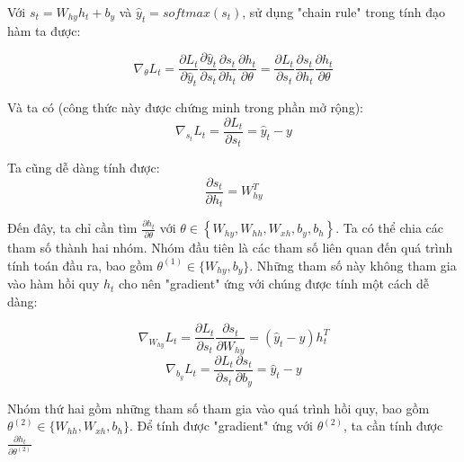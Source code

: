 Với $s_t = W_{hy} h_t + b_y$ và $\hat{y}_t = softmax(s_t)$, sử dụng "chain rule" trong tính đạo hàm ta được:
	
\begin{equation} \label{gradientCalculating1}
	\nabla_{\theta} L_t = \frac{\partial L_t}{\partial \hat{y}_t} \frac{\partial \hat{y}_t}{\partial s_t} \frac{\partial s_t}{\partial h_t} \frac{\partial h_t}{\partial \theta}  = \frac{\partial L_t}{\partial s_t} \frac{\partial s_t}{\partial h_t} \frac{\partial h_t}{\partial \theta}
\end{equation}

Và ta có (công thức này được chứng minh trong phần mở rộng):
\begin{equation} \label{gradientCalculating2}
	\nabla_{s_t}L_t = \frac{\partial L_t}{\partial s_t} = \hat{y}_t - y
\end{equation}

Ta cũng dễ dàng tính được:
\begin{equation} \label{gradientCalculating3}
	\frac{\partial s_t}{\partial h_t} = W_{hy}^T
\end{equation}

Đến đây, ta chỉ cần tìm $\frac{\partial h_t}{\partial \theta}$ với $\theta \in \left\{W_{hy},W_{hh},W_{xh},b_y,b_h \right \}$. Ta có thể chia các tham số thành hai nhóm. Nhóm đầu tiên là các tham số liên quan đến quá trình tính toán đầu ra, bao gồm $\theta^{(1)} \in \{W_{hy}, b_y\}$. Những tham số này không tham gia vào hàm hồi quy $h_t$ cho nên "gradient" ứng với chúng được tính một cách dễ dàng:

\begin{equation} \label{gradientCalculating4}
	\nabla_{W_{hy}}L_t = \frac{\partial L_t}{\partial s_t} \frac{\partial s_t}{\partial W_{hy}}  =  (\hat{y}_t - y) h_t^T
\end{equation}
\begin{equation} \label{gradientCalculating5}
	\nabla_{b_{y}}L_t = \frac{\partial L_t}{\partial s_t} \frac{\partial s_t}{\partial b_{y}}  =  \hat{y}_t - y
\end{equation}

Nhóm thứ hai gồm những tham số tham gia vào quá trình hồi quy, bao gồm $\theta^{(2)} \in \{W_{hh},W_{xh},b_h \}$. Để tính được "gradient" ứng với $\theta^{(2)}$, ta cần tính được $\frac{\partial h_t}{\partial \theta^{(2)} }$

